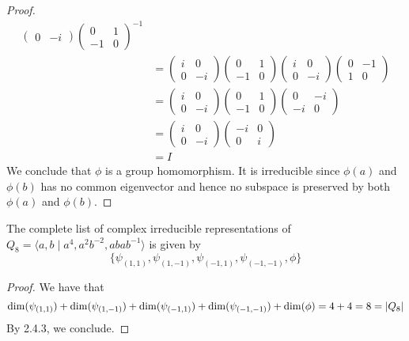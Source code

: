 \documentclass[a4paper]{article}
\begin{document}
\begin{prp}{}{}
\begin{proof}
\begin{align*}
\begin{pmatrix}
0 & -i
\end{pmatrix}\begin{pmatrix}
0 & 1\\
-1 & 0
\end{pmatrix}^{-1}\\
&=\begin{pmatrix}
i & 0\\
0 & -i
\end{pmatrix}\begin{pmatrix}
0 & 1\\
-1 & 0
\end{pmatrix}\begin{pmatrix}
i & 0\\
0 & -i
\end{pmatrix}\begin{pmatrix}
0 & -1\\
1 & 0
\end{pmatrix}\\
&=\begin{pmatrix}
i & 0\\
0 & -i
\end{pmatrix}\begin{pmatrix}
0 & 1\\
-1 & 0
\end{pmatrix}\begin{pmatrix}
0 & -i\\
-i & 0
\end{pmatrix}\\
&=\begin{pmatrix}
i & 0\\
0 & -i
\end{pmatrix}\begin{pmatrix}
-i & 0\\
0 & i
\end{pmatrix}\\
&=I
\end{align*}
We conclude that $\phi$ is a group homomorphism. It is irreducible since $\phi(a)$ and $\phi(b)$ has no common eigenvector and hence no subspace is preserved by both $\phi(a)$ and $\phi(b)$. 
\end{proof}
\end{prp}

\begin{thm}{}{} The complete list of complex irreducible representations of $Q_8=\langle a,b\;|\;a^4,a^2b^{-2},abab^{-1}\rangle$ is given by $$\{\psi_{(1,1)},\psi_{(1,-1)},\psi_{(-1,1)},\psi_{(-1,-1)},\phi\}$$ \tcbline
\begin{proof}
We have that $$\dim(\psi_{(1,1)})+\dim(\psi_{(1,-1)})+\dim(\psi_{(-1,1)})+\dim(\psi_{(-1,-1)})+\dim(\phi)=4+4=8=\abs{Q_8}$$ By 2.4.3, we conclude. 
\end{proof}
\end{thm}
\end{document}
